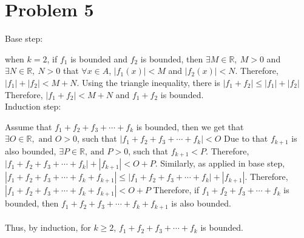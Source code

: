 \documentclass{article}
\begin{document}
\newpage
\section*{Problem 5}
    Base step: 

    when \(k=2\), if \(f_1\) is bounded and \(f_2\) is bounded, then \(\exists M\in \mathbb{R},\ M>0\) and \(\exists N\in \mathbb{R},\ N>0\)
    that \(\forall x\in A\), \(|f_1(x)|<M\) and \(|f_2(x)|<N\). Therefore, \(|f_1|+|f_2|<M+N\). Using the triangle inequality, there is \(|f_1+f_2|\leqslant |f_1|+|f_2|\)
    Therefore, \(|f_1+f_2|<M+N\) and \(f_1+f_2\) is bounded.\\
    Induction step:

    Assume that \(f_1+f_2+f_3+\cdots +f_k\) is bounded, then we get that \\\(\exists O\in \mathbb{R}, \text{ and }O>0\), such that \(|f_1+f_2+f_3+\cdots +f_k|<O\)
    Due to that \(f_{k+1}\) is also bounded, \(\exists P\in \mathbb{R}, \ \text{and } P>0\), such that \(f_{k+1}<P\). Therefore, \(|f_1+f_2+f_3+\cdots +f_k|+|f_{k+1}|<O+P\).
    Similarly, as applied in base step, \(|f_1+f_2+f_3+\cdots +f_k+f_{k+1}|\leqslant |f_1+f_2+f_3+\cdots +f_k|+|f_{k+1}|\). Therefore, \(|f_1+f_2+f_3+\cdots +f_k+f_{k+1}|<O+P\)
    Therefore, if \(f_1+f_2+f_3+\cdots +f_k\) is bounded, then \(f_1+f_2+f_3+\cdots +f_k+f_{k+1}\) is also bounded. 
    \\ \\
    Thus, by induction, for \(k\geqslant 2\), \(f_1+f_2+f_3+\cdots +f_k\) is bounded.



\end{document}
